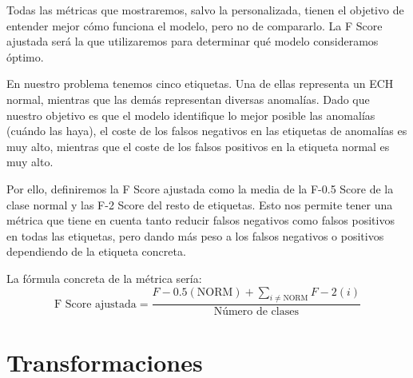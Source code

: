 Todas las métricas que mostraremos, salvo la personalizada, tienen el objetivo de entender mejor cómo funciona el modelo, pero no de compararlo. La F Score ajustada será la que utilizaremos para determinar qué modelo consideramos óptimo.

En nuestro problema tenemos cinco etiquetas. Una de ellas representa un \ac{ECH} normal, mientras que las demás representan diversas anomalías. Dado que nuestro objetivo es que el modelo identifique lo mejor posible las anomalías (cuándo las haya), el coste de los falsos negativos en las etiquetas de anomalías es muy alto, mientras que el coste de los falsos positivos en la etiqueta normal es muy alto.

Por ello, definiremos la F Score ajustada como la media de la F-0.5 Score de la clase normal y las  F-2 Score del resto de etiquetas. Esto nos permite tener una métrica que tiene en cuenta tanto reducir falsos negativos como falsos positivos en todas las etiquetas, pero dando más peso a los falsos negativos o positivos dependiendo de la etiqueta concreta.

La fórmula concreta de la métrica sería:
\begin{equation*}
	\text{F Score ajustada} = \frac{F-0.5(\text{NORM}) + \sum_{i \neq \text{NORM}}F-2(i)}{\text{Número de clases}}
\end{equation*}


\section{Transformaciones}